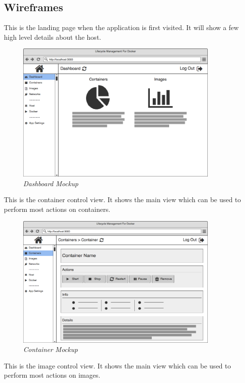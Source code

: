 \clearpage
\subsection{Wireframes}
\label{appendix:wireframes}
This is the landing page when the application is first visited. It will show a few high level details about the host.

\begin{figure}[!ht]
\centering
\includegraphics*[width=0.9\textwidth]{wireframes/dashboard}
\caption{\em Dashboard Mockup}
\end{figure}
This is the container control view. It shows the main view which can be used to perform most actions on containers.

\begin{figure}[!ht]
\centering
\includegraphics*[width=0.9\textwidth]{wireframes/container}
\caption{\em Container Mockup}
\end{figure}
This is the image control view. It shows the main view which can be used to perform most actions on images.

